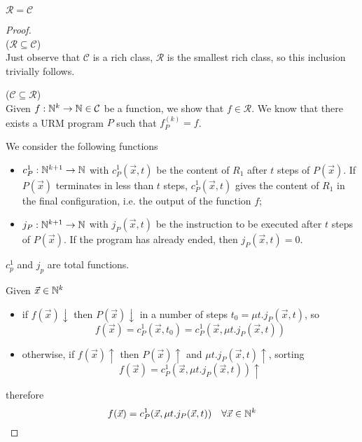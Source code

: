 \begin{theorem}\label{reqc} 
  $\mathcal{R} = \mathcal{C}$
  \begin{proof}
    \  \\    
    ($\mathcal{R} \subseteq \mathcal{C}$)\\
    Just observe that
    $\mathcal{C} $ is a rich class, $\mathcal{R}$ is the
    smallest rich class, so this inclusion trivially follows.

    ($\mathcal{C} \subseteq \mathcal{R}$) \\
    Given $f : \mathbb{N}^k \to \mathbb{N} \in \mathcal{C}$ be a function, we show
    that $f \in \mathcal{R}$. We know that there exists a URM program $P$ such that $ f_P^{(k)} = f$.

    We consider the following functions
    \begin{itemize}
      \item $c_P^1:\mathbb{N}^{k+1}\to\mathbb{N}$ with $c_P^1(\vec{x}, t)$ be the content of $R_1$ after $t$ steps of $P(\vec{x})$. 
            If $P(\vec{x})$ terminates in less than $t$ steps, $c_P^1(\vec{x}, t)$ gives the content of $R_1$ in the final configuration, i.e. the output of the function $f$;
      \item $j_P:\mathbb{N}^{k+1}\to\mathbb{N}$ with $j_P(\vec{x},t)$ be the instruction to be executed after $t$ steps of $P(\vec{x})$. If the program has already ended, then $ j_P(\vec{x},t) = 0$.
    \end{itemize}

    $c_p^1$ and $j_p$ are total functions.

    Given $\vec{x}\in\mathbb{N}^k$
    \begin{itemize}
      \item if $f(\vec{x})\downarrow$ then $P(\vec{x})\downarrow$ in a number of steps $ t_0 = \mu t.j_P(\vec{x},t)$, so 
      \begin{equation*}
        f(\vec{x}) = c_P^1(\vec{x},t_0) = c_P^1(\vec{x}, \mu t.j_P(\vec{x},t))
      \end{equation*}
      \item otherwise, if $f(\vec{x})\uparrow$ then $P(\vec{x})\uparrow$ and $\mu t.j_P(\vec{x},t)\uparrow$, sorting
      \begin{equation*}
        f(\vec{x}) = c_P^1(\vec{x}, \mu t.j_P(\vec{x},t))\uparrow
      \end{equation*}
    \end{itemize}
    therefore
    \begin{equation*}
      f(\vec{x}) = c_P^1(\vec{x}, \mu t.j_P(\vec{x},t)) \quad \forall \vec{x}\in\mathbb{N}^k
    \end{equation*}


\end{proof}
\end{theorem}

